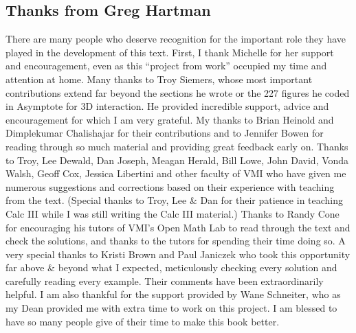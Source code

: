 \begin{itemize}
\begin{itemize}
%


\subsection{Thanks from Greg Hartman}

There are many people who deserve recognition for the important role they have played in the development of this text. First, I thank Michelle for her support and encouragement, even as this ``project from work'' occupied my time and attention at home. Many thanks to Troy Siemers, whose most important contributions extend far beyond the sections he wrote or the 227 figures he coded in Asymptote for 3D interaction.  He provided incredible support, advice and encouragement for which I am very grateful. My thanks to Brian Heinold and Dimplekumar Chalishajar for their contributions and to Jennifer Bowen for reading through so much material and providing great feedback early on. Thanks to Troy, Lee Dewald, Dan Joseph, Meagan Herald, Bill Lowe, John David, Vonda Walsh, Geoff Cox, Jessica Libertini and other faculty of VMI who have given me numerous suggestions and corrections based on their experience with teaching from the text. (Special thanks to Troy, Lee \& Dan for their patience in teaching Calc III while I was still writing the Calc III material.) Thanks to Randy Cone for encouraging his tutors of VMI's Open Math Lab to read through the text and check the solutions, and thanks to the tutors for spending their time doing so. A very special thanks to Kristi Brown and Paul Janiczek who took this opportunity far above \& beyond what I expected, meticulously checking every solution and carefully reading every example. Their comments have been extraordinarily helpful. I am also thankful for the support provided by Wane Schneiter, who as my Dean provided me with extra time to work on this project. I am blessed to have so many people give of their time to make this book better.


\end{itemize}
\end{itemize}
